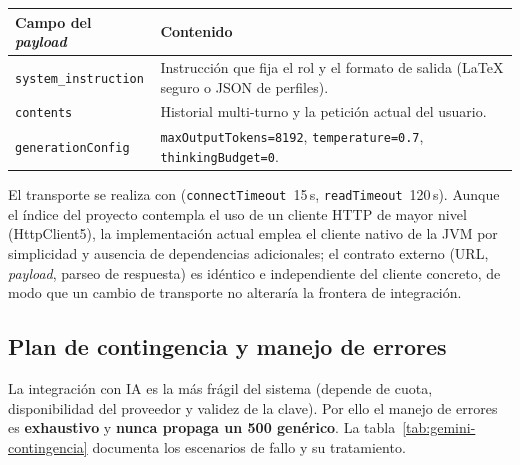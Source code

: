 \vspace{0.2cm}
\noindent
\renewcommand{\arraystretch}{1.3}
\fontsize{8.5}{10.2}\selectfont\sffamily
\begin{tabularx}{\textwidth}{|L{3.8cm}|Y|}
\hline
{}
\sffamily\textbf{Campo del \textit{payload}} & \sffamily\textbf{Contenido} \\
\hline
\texttt{system\_instruction} & Instrucción que fija el rol y el formato de salida (LaTeX seguro o JSON de perfiles). \\ \hline
{}
\texttt{contents} & Historial multi-turno y la petición actual del usuario. \\ \hline
\texttt{generationConfig} & \texttt{maxOutputTokens=8192}, \texttt{temperature=0.7}, \texttt{thinkingBudget=0}. \\ \hline
\end{tabularx}
\label{tab:gemini-payload}

\begin{NotaTecnica}
El transporte se realiza con  (\texttt{connectTimeout}~15\,s,
\texttt{readTimeout}~120\,s). Aunque el índice del proyecto contempla el uso de un cliente
HTTP de mayor nivel (HttpClient5), la implementación actual emplea el cliente nativo de la
JVM por simplicidad y ausencia de dependencias adicionales; el contrato externo (URL,
\textit{payload}, parseo de respuesta) es idéntico e independiente del cliente concreto, de
modo que un cambio de transporte no alteraría la frontera de integración.
\end{NotaTecnica}

\subsection{Plan de contingencia y manejo de errores}
\label{subsec:gemini_contingencia}

La integración con IA es la más frágil del sistema (depende de cuota, disponibilidad del
proveedor y validez de la clave). Por ello el manejo de errores es \textbf{exhaustivo} y
\textbf{nunca propaga un 500 genérico}. La tabla~\ref{tab:gemini-contingencia} documenta
los escenarios de fallo y su tratamiento.


